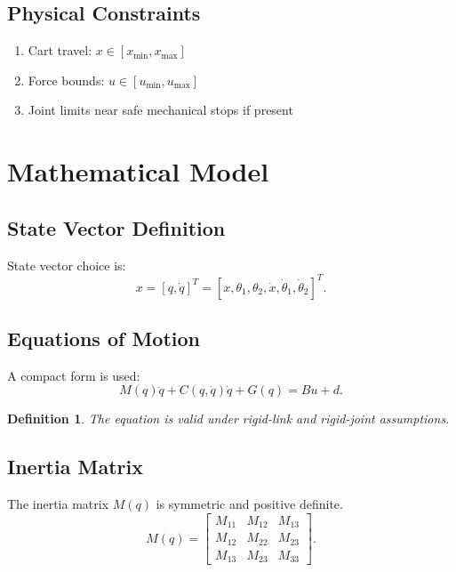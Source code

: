 \documentclass[11pt,a4paper]{article}
\newtheorem{definition}{Definition}[section]
\begin{document}
\subsection{Physical Constraints}
\begin{enumerate}
    \item Cart travel: $x \in [x_{\min}, x_{\max}]$
    \item Force bounds: $u \in [u_{\min},u_{\max}]$
    \item Joint limits near safe mechanical stops if present
\end{enumerate}

\section{Mathematical Model}

\subsection{State Vector Definition}
State vector choice is:
\begin{equation}
    x = [q,\dot q]^T = [x,\theta_1,\theta_2,\dot x,\dot{\theta}_1,\dot{\theta}_2]^T.
\end{equation}

\subsection{Equations of Motion}
A compact form is used:
\begin{equation}
    M(q)\ddot q + C(q,\dot q)\dot q + G(q) = B u + d.
\end{equation}

\begin{definition}
The equation is valid under rigid-link and rigid-joint assumptions.
\end{definition}

\subsection{Inertia Matrix}
The inertia matrix $M(q)$ is symmetric and positive definite.
\begin{equation}
    M(q)=\begin{bmatrix}
    M_{11} & M_{12} & M_{13}\\
    M_{12} & M_{22} & M_{23}\\
    M_{13} & M_{23} & M_{33}
    \end{bmatrix}.
\end{equation}
\end{document}
